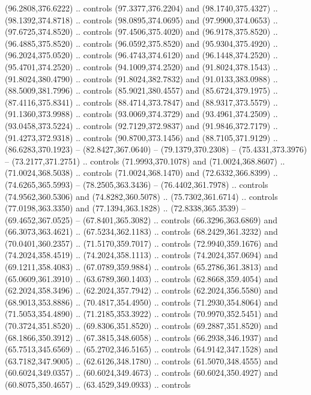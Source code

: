 \begin{scope}[cm={{1.25,0.0,0.0,-1.25,(0.0,743.43331)}}]
    (96.2808,376.6222) .. controls (97.3377,376.2204) and (98.1740,375.4327) ..
    (98.1392,374.8718) .. controls (98.0895,374.0695) and (97.9900,374.0653) ..
    (97.6725,374.8520) .. controls (97.4506,375.4020) and (96.9178,375.8520) ..
    (96.4885,375.8520) .. controls (96.0592,375.8520) and (95.9304,375.4920) ..
    (96.2024,375.0520) .. controls (96.4743,374.6120) and (96.1448,374.2520) ..
    (95.4701,374.2520) .. controls (94.1009,374.2520) and (91.8024,378.1543) ..
    (91.8024,380.4790) .. controls (91.8024,382.7832) and (91.0133,383.0988) ..
    (88.5009,381.7996) .. controls (85.9021,380.4557) and (85.6724,379.1975) ..
    (87.4116,375.8341) .. controls (88.4714,373.7847) and (88.9317,373.5579) ..
    (91.1360,373.9988) .. controls (93.0069,374.3729) and (93.4961,374.2509) ..
    (93.0458,373.5224) .. controls (92.7129,372.9837) and (91.9846,372.7179) ..
    (91.4273,372.9318) .. controls (90.8700,373.1456) and (88.7105,371.9129) ..
    (86.6283,370.1923) -- (82.8427,367.0640) -- (79.1379,370.2308) --
    (75.4331,373.3976) -- (73.2177,371.2751) .. controls (71.9993,370.1078) and
    (71.0024,368.8607) .. (71.0024,368.5038) .. controls (71.0024,368.1470) and
    (72.6332,366.8399) .. (74.6265,365.5993) -- (78.2505,363.3436) --
    (76.4402,361.7978) .. controls (74.9562,360.5306) and (74.8282,360.5078) ..
    (75.7302,361.6714) .. controls (77.0198,363.3350) and (77.1394,363.1828) ..
    (72.8338,365.3539) -- (69.4652,367.0525) -- (67.8401,365.3082) .. controls
    (66.3296,363.6869) and (66.3073,363.4621) .. (67.5234,362.1183) .. controls
    (68.2429,361.3232) and (70.0401,360.2357) .. (71.5170,359.7017) .. controls
    (72.9940,359.1676) and (74.2024,358.4519) .. (74.2024,358.1113) .. controls
    (74.2024,357.0694) and (69.1211,358.4083) .. (67.0789,359.9884) .. controls
    (65.2786,361.3813) and (65.0609,361.3910) .. (63.6789,360.1403) .. controls
    (62.8668,359.4054) and (62.2024,358.3496) .. (62.2024,357.7942) .. controls
    (62.2024,356.5580) and (68.9013,353.8886) .. (70.4817,354.4950) .. controls
    (71.2930,354.8064) and (71.5053,354.4890) .. (71.2185,353.3922) .. controls
    (70.9970,352.5451) and (70.3724,351.8520) .. (69.8306,351.8520) .. controls
    (69.2887,351.8520) and (68.1866,350.3912) .. (67.3815,348.6058) .. controls
    (66.2938,346.1937) and (65.7513,345.6569) .. (65.2702,346.5165) .. controls
    (64.9142,347.1528) and (63.7182,347.9005) .. (62.6126,348.1780) .. controls
    (61.5070,348.4555) and (60.6024,349.0357) .. (60.6024,349.4673) .. controls
    (60.6024,350.4927) and (60.8075,350.4657) .. (63.4529,349.0933) .. controls

\end{scope}
